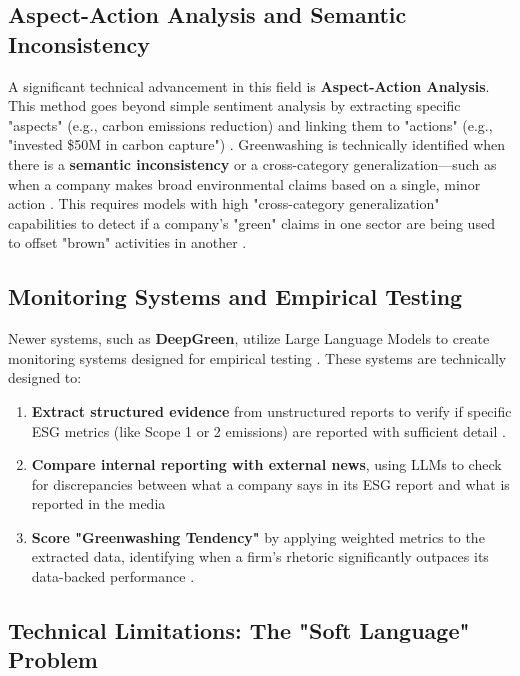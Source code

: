 \subsection{ Aspect-Action Analysis and Semantic Inconsistency}

A significant technical advancement in this field is \textbf{Aspect-Action Analysis}. This method goes beyond simple sentiment analysis by extracting specific "aspects" (e.g., carbon emissions reduction) and linking them to "actions" (e.g., "invested \$50M in carbon capture")  \parencite{keane_ong_369a0b63}. Greenwashing is technically identified when there is a \textbf{semantic inconsistency} or a cross-category generalization—such as when a company makes broad environmental claims based on a single, minor action  \parencite{keane_ong_369a0b63}. This requires models with high "cross-category generalization" capabilities to detect if a company's "green" claims in one sector are being used to offset "brown" activities in another  \parencite{keane_ong_369a0b63}.
\subsection{ Monitoring Systems and Empirical Testing}

Newer systems, such as \textbf{DeepGreen}, utilize Large Language Models to create monitoring systems designed for empirical testing  \parencite{chong_xu_bff21576}. These systems are technically designed to:
\begin{enumerate}
\item 

\textbf{Extract structured evidence} from unstructured reports to verify if specific ESG metrics (like Scope 1 or 2 emissions) are reported with sufficient detail  \parencite{chong_xu_bff21576}.\item 

\textbf{Compare internal reporting with external news}, using LLMs to check for discrepancies between what a company says in its ESG report and what is reported in the media  \parencite[]{mariya_pavlova_259be499, fabian_billert_a5fbb687}\item 

\textbf{Score "Greenwashing Tendency"} by applying weighted metrics to the extracted data, identifying when a firm’s rhetoric significantly outpaces its data-backed performance  \parencite{chong_xu_bff21576}.
\end{enumerate}
\subsection{Technical Limitations: The "Soft Language" Problem}

